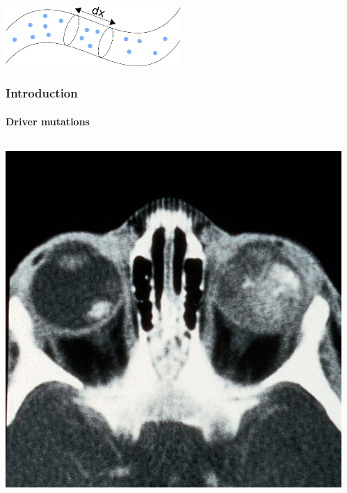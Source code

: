 \documentclass{beamer}
\begin{document}
\begin{frame}
\begin{columns}
\begin{column}{0.5\textwidth}
        \end{column}
    \end{columns}
    \begin{center}
    \includegraphics[width=0.5\textwidth]{figures/air}
    \end{center}
\end{frame}

\begin{frame}
    \frametitle{Introduction}
    \framesubtitle{Driver mutations}

    \begin{columns}
        \begin{column}{0.5\textwidth}
        \includegraphics[width=\textwidth]{figures/tumour2.jpg}
        \end{column}
        \begin{column}{0.5\textwidth}

\end{column}
\end{columns}
\end{frame}
\end{document}
